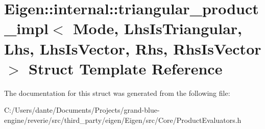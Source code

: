 \hypertarget{struct_eigen_1_1internal_1_1triangular__product__impl}{}\section{Eigen\+::internal\+::triangular\+\_\+product\+\_\+impl$<$ Mode, Lhs\+Is\+Triangular, Lhs, Lhs\+Is\+Vector, Rhs, Rhs\+Is\+Vector $>$ Struct Template Reference}
\label{struct_eigen_1_1internal_1_1triangular__product__impl}


The documentation for this struct was generated from the following file\+:\begin{DoxyCompactItemize}
\item 
C\+:/\+Users/dante/\+Documents/\+Projects/grand-\/blue-\/engine/reverie/src/third\+\_\+party/eigen/\+Eigen/src/\+Core/Product\+Evaluators.\+h\end{DoxyCompactItemize}
